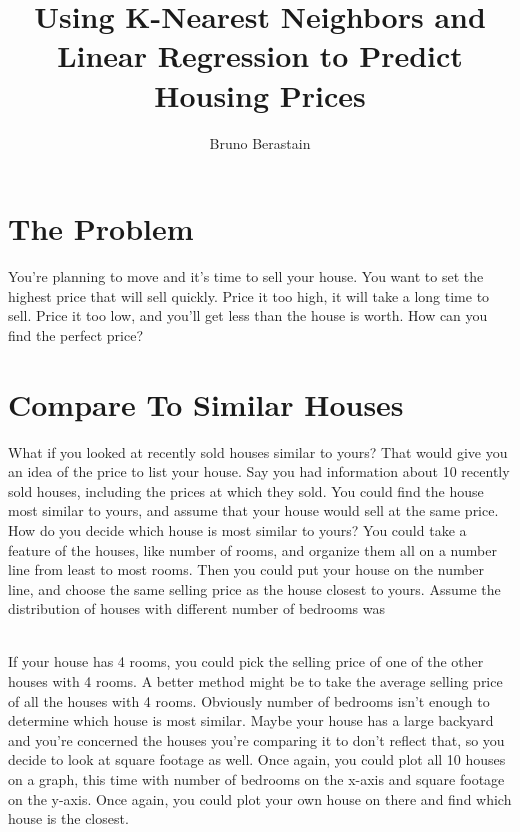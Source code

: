 \documentclass{article}
\author{Bruno Berastain}
\begin{document}
\title{Using K-Nearest Neighbors and Linear Regression to Predict Housing Prices}
\maketitle

\section{The Problem}
You're planning to move and it's time to sell your house. You want to set the highest price that will sell quickly. Price it too high, it will take a long time to sell. Price it too low, and you'll get less than the house is worth. How can you find the perfect price?

\section{Compare To Similar Houses}
What if you looked at recently sold houses similar to yours? That would give you an idea of the price to list your house. Say you had information about 10 recently sold houses, including the prices at which they sold. You could find the house most similar to yours, and assume that your house would sell at the same price. How do you decide which house is most similar to yours? You could take a feature of the houses, like number of rooms, and organize them all on a number line from least to most rooms. Then you could put your house on the number line, and choose the same selling price as the house closest to yours. Assume the distribution of houses with different number of bedrooms was\\

\\

If your house has 4 rooms, you could pick the selling price of one of the other houses with 4 rooms. A better method might be to take the average selling price of all the houses with 4 rooms. Obviously number of bedrooms isn't enough to determine which house is most similar. Maybe your house has a large backyard and you're concerned the houses you're comparing it to don't reflect that, so you decide to look at square footage as well. Once again, you could plot all 10 houses on a graph, this time with number of bedrooms on the x-axis and square footage on the y-axis. Once again, you could plot your own house on there and find which house is the closest.
\end{document}
